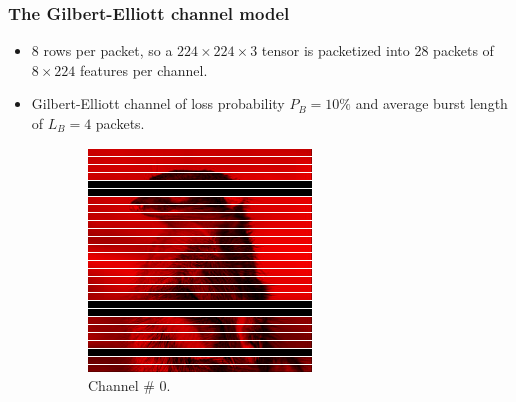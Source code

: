 \documentclass{beamer}
\begin{document}
\begin{frame}
	\frametitle{The Gilbert-Elliott channel model}
\begin{itemize}
	\item 8 rows per packet, so a $224 \times 224 \times 3$ tensor is packetized into 28 packets of $8 \times 224$ features per channel.
	\item Gilbert-Elliott channel of loss probability $P_B = 10\%$ and average burst length of $L_B = 4$ packets.
\end{itemize}
	\begin{figure}[H]
		\centering
		\begin{subfigure}{.25\linewidth}
			\centering
			\includegraphics[width = \linewidth]{Figures/gridraftertrans.png}
			\caption{Channel \# 0.}
		\end{subfigure}%
		\hspace{1em}%
		\begin{subfigure}{.25\linewidth}
			\centering

\end{subfigure}
\end{figure}
\end{frame}
\end{document}
